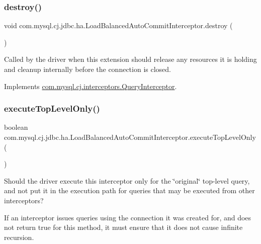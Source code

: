 \subsubsection{\texorpdfstring{destroy()}{destroy()}}
{\footnotesize\ttfamily void com.\+mysql.\+cj.\+jdbc.\+ha.\+Load\+Balanced\+Auto\+Commit\+Interceptor.\+destroy (\begin{DoxyParamCaption}{ }\end{DoxyParamCaption})}

Called by the driver when this extension should release any resources it is holding and cleanup internally before the connection is closed. 

Implements \mbox{\hyperlink{interfacecom_1_1mysql_1_1cj_1_1interceptors_1_1_query_interceptor_a123809a91800f4f4409f5f37717bf9c8}{com.\+mysql.\+cj.\+interceptors.\+Query\+Interceptor}}.

\mbox{\label{classcom_1_1mysql_1_1cj_1_1jdbc_1_1ha_1_1_load_balanced_auto_commit_interceptor_a048bf25ce3ec24d6db036ec6c4b49884}} 
\subsubsection{\texorpdfstring{execute\+Top\+Level\+Only()}{executeTopLevelOnly()}}
{\footnotesize\ttfamily boolean com.\+mysql.\+cj.\+jdbc.\+ha.\+Load\+Balanced\+Auto\+Commit\+Interceptor.\+execute\+Top\+Level\+Only (\begin{DoxyParamCaption}{ }\end{DoxyParamCaption})}

Should the driver execute this interceptor only for the \char`\"{}original\char`\"{} top-\/level query, and not put it in the execution path for queries that may be executed from other interceptors?

If an interceptor issues queries using the connection it was created for, and does not return {\ttfamily true} for this method, it must ensure that it does not cause infinite recursion.

